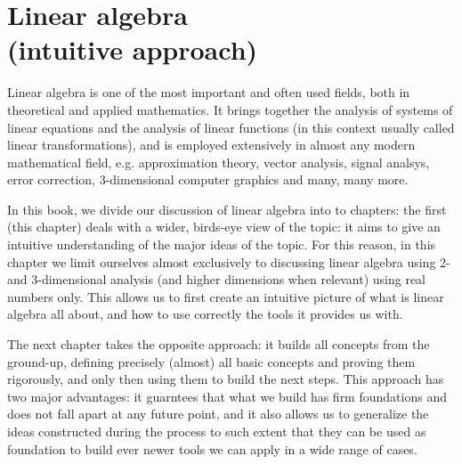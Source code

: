 \chapter{Linear algebra\\(intuitive approach)}
Linear algebra is one of the most important and often used fields, both in theoretical and applied mathematics. It brings together the analysis of systems of linear equations and the analysis of linear functions (in this context usually called linear transformations), and is employed extensively in almost any modern mathematical field, e.g. approximation theory, vector analysis, signal analsys, error correction, 3-dimensional computer graphics and many, many more.

In this book, we divide our discussion of linear algebra into to chapters: the first (this chapter) deals with a wider, birds-eye view of the topic: it aims to give an intuitive understanding of the major ideas of the topic. For this reason, in this chapter we limit ourselves almost exclusively to discussing linear algebra using 2- and 3-dimensional analysis (and higher dimensions when relevant) using real numbers only. This allows us to first create an intuitive picture of what is linear algebra all about, and how to use correctly the tools it provides us with.

The next chapter takes the opposite approach: it builds all concepts from the ground-up, defining precisely (almost) all basic concepts and proving them rigorously, and only then using them to build the next steps. This approach has two major advantages: it guarntees that what we build has firm foundations and does not fall apart at any future point, and it also allows us to generalize the ideas constructed during the process to such extent that they can be used as foundation to build ever newer tools we can apply in a wide range of cases.
